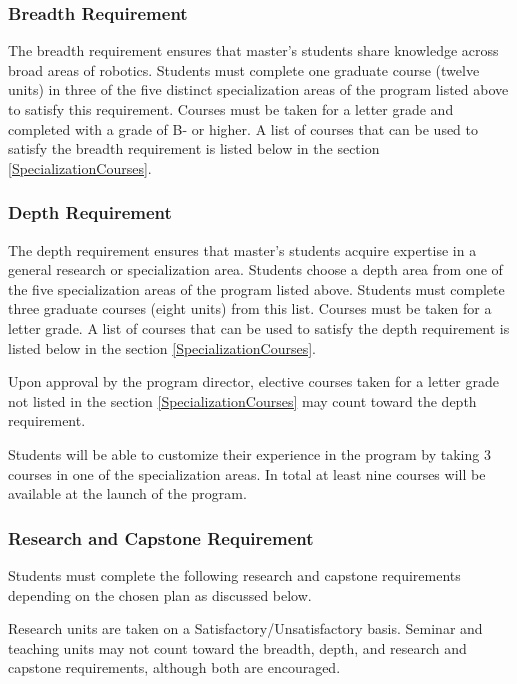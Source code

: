 \documentclass[11pt,letterpaper]{article}
\begin{document}
\subsubsection{Breadth Requirement}

The breadth requirement ensures that master’s students share knowledge
across broad areas of robotics. Students must complete one graduate
course (twelve units) in three of the five distinct specialization
areas of the program listed above to satisfy this requirement. Courses
must be taken for a letter grade and completed with a grade of B- or
higher. A list of courses that can be used to satisfy the breadth
requirement is listed below in the section \ref{SpecializationCourses}.

\subsubsection{Depth Requirement}

The depth requirement ensures that master’s students acquire expertise
in a general research or specialization area. Students choose a depth
area from one of the five specialization areas of the program listed
above. Students must complete three graduate courses (eight units)
from this list. Courses must be taken for a letter grade. A list of
courses that can be used to satisfy the depth requirement is listed
below in the section \ref{SpecializationCourses}.

Upon approval by the program director, elective courses taken for a
letter grade not listed in the section \ref{SpecializationCourses} may
count toward the depth requirement.

Students will be able to customize their experience in the program by
taking 3 courses in one of the specialization areas. In total at least
nine courses will be available at the launch of the program. 

\subsubsection{Research and Capstone Requirement}

Students must complete the following research and capstone
requirements depending on the chosen plan as discussed below.

Research units are taken on a Satisfactory/Unsatisfactory
basis. Seminar and teaching units may not count toward the breadth,
depth, and research and capstone requirements, although both are
encouraged.
\end{document}

